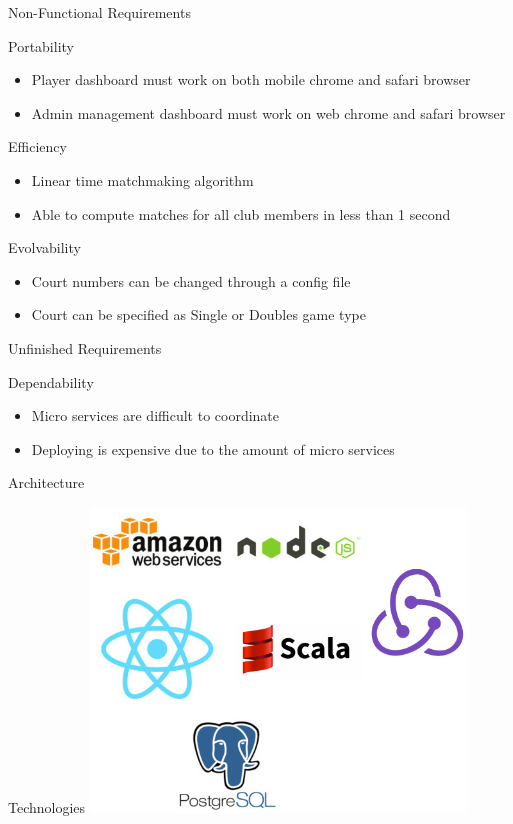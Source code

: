 \documentclass{beamer}
\begin{document}
\begin{frame}
\Huge Non-Functional Requirements
\end{frame}

\begin{frame}{Portability}
\begin{itemize}
\item Player dashboard must work on both mobile chrome and safari browser
\item Admin management dashboard must work on web chrome and safari browser
\end{itemize}
\end{frame}

\begin{frame}{Efficiency}
\begin{itemize}
\item Linear time matchmaking algorithm
\item Able to compute matches for all club members in less than 1 second
\end{itemize}
\end{frame}

\begin{frame}{Evolvability}
\begin{itemize}
\item Court numbers can be changed through a config file
\item Court can be specified as Single or Doubles game type
\end{itemize}
\end{frame}

\begin{frame}
\Huge Unfinished Requirements
\end{frame}

\begin{frame}{Dependability}
\begin{itemize}
\item Micro services are difficult to coordinate
\item Deploying is expensive due to the amount of micro services
\end{itemize}
\end{frame}

\begin{frame}
\Huge Architecture
\end{frame}

\begin{frame}{Technologies}
\includegraphics[width=10cm]{logos.jpg}
\end{frame}
\end{document}

